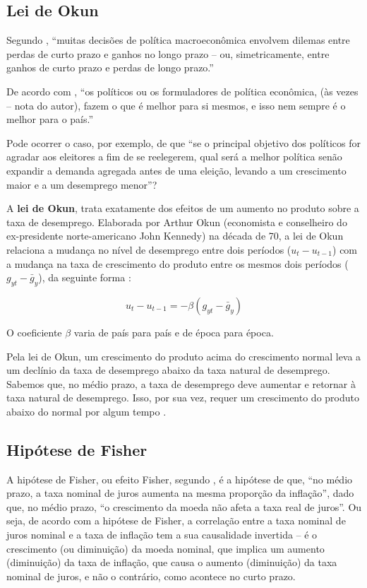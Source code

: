 \documentclass[
	10pt,				%
	openright,			%
	twoside,			%
	a5paper,			%
	english,			%
	french,				%
	spanish,			%
	brazil				%
	]{abntex2}
\renewenvironment{quote}
  {\small\list{}{\rightmargin=0.1cm \leftmargin=4cm}%
   \item\relax}
  {\endlist}
\begin{document}
\subsection{Lei de Okun}\label{lei-de-okun}

Segundo , ``muitas decisões de política
macroeconômica envolvem dilemas entre perdas de curto prazo e ganhos no
longo prazo -- ou, simetricamente, entre ganhos de curto prazo e perdas
de longo prazo.''

De acordo com , ``os políticos ou os
formuladores de política econômica, (às vezes -- nota do autor), fazem o
que é melhor para si mesmos, e isso nem sempre é o melhor para o país.''

Pode ocorrer o caso, por exemplo, de que ``se o principal objetivo dos
políticos for agradar aos eleitores a fim de se reelegerem, qual será a
melhor política senão expandir a demanda agregada antes de uma eleição,
levando a um crescimento maior e a um desemprego menor''?

A \textbf{lei de Okun}, trata exatamente dos efeitos de um aumento no
produto sobre a taxa de desemprego. Elaborada por Arthur Okun
(economista e conselheiro do ex-presidente norte-americano John Kennedy)
na década de 70, a lei de Okun relaciona a mudança no nível de
desemprego entre dois períodos (\(u_t - u_{t-1}\)) com a mudança na taxa
de crescimento do produto entre os mesmos dois períodos
(\(g_{yt} - \bar{g}_y\)), da seguinte forma \cite[p.~168]{blanchard}:

\[u_t - u_{t-1} = -\beta(g_{yt} - \bar{g}_y)\]

O coeficiente \(\beta\) varia de país para país e de época para época.

\begin{quote}
Pela lei de Okun, um crescimento do produto acima do crescimento normal
leva a um declínio da taxa de desemprego abaixo da taxa natural de
desemprego. Sabemos que, no médio prazo, a taxa de desemprego deve
aumentar e retornar à taxa natural de desemprego. Isso, por sua vez,
requer um crescimento do produto abaixo do normal por algum tempo
\cite[p.~492]{blanchard}.
\end{quote}

\subsection{Hipótese de Fisher}\label{hipuxf3tese-de-fisher}

A hipótese de Fisher, ou efeito Fisher, segundo
, é a hipótese de que, ``no médio prazo, a
taxa nominal de juros aumenta na mesma proporção da inflação'', dado
que, no médio prazo, ``o crescimento da moeda não afeta a taxa real de
juros''. Ou seja, de acordo com a hipótese de Fisher, a correlação entre
a taxa nominal de juros nominal e a taxa de inflação tem a sua
causalidade invertida -- é o crescimento (ou diminuição) da moeda
nominal, que implica um aumento (diminuição) da taxa de inflação, que
causa o aumento (diminuição) da taxa nominal de juros, e não o
contrário, como acontece no curto prazo.
\end{document}
